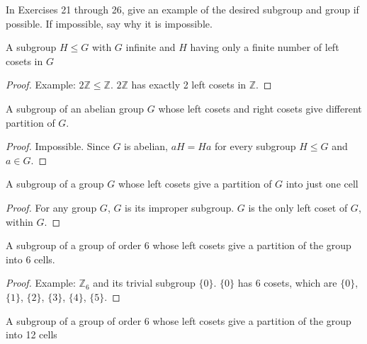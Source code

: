 In Exercises 21 through 26, give an example of the desired subgroup and group if possible. If impossible, say why
it is impossible.

\newpage
\begin{exercise}
    A subgroup $H\leq G$ with $G$ infinite and $H$ having only a finite number of left cosets in $G$
\end{exercise}

\begin{proof}
    Example: $2\mathbb{Z} \leq \mathbb{Z}$. $2\mathbb{Z}$ has exactly 2 left cosets in $\mathbb{Z}$.
\end{proof}

\newpage
\begin{exercise}
    A subgroup of an abelian group $G$ whose left cosets and right cosets give different partition of $G$.
\end{exercise}

\begin{proof}
    Impossible. Since $G$ is abelian, $aH = Ha$ for every subgroup $H\leq G$ and $a\in G$.
\end{proof}

\newpage
\begin{exercise}
    A subgroup of a group $G$ whose left cosets give a partition of $G$ into just one cell
\end{exercise}

\begin{proof}
    For any group $G$, $G$ is its improper subgroup. $G$ is the only left coset of $G$, within $G$.
\end{proof}

\newpage
\begin{exercise}
    A subgroup of a group of order 6 whose left cosets give a partition of the group into 6 cells.
\end{exercise}

\begin{proof}
    Example: $\mathbb{Z}_{6}$ and its trivial subgroup $\{0\}$. $\{0\}$ has 6 cosets, which are $\{0\}$, $\{1\}$, $\{2\}$, $\{3\}$, $\{4\}$, $\{5\}$.
\end{proof}

\newpage
\begin{exercise}
    A subgroup of a group of order 6 whose left cosets give a partition of the group into 12 cells
\end{exercise}

